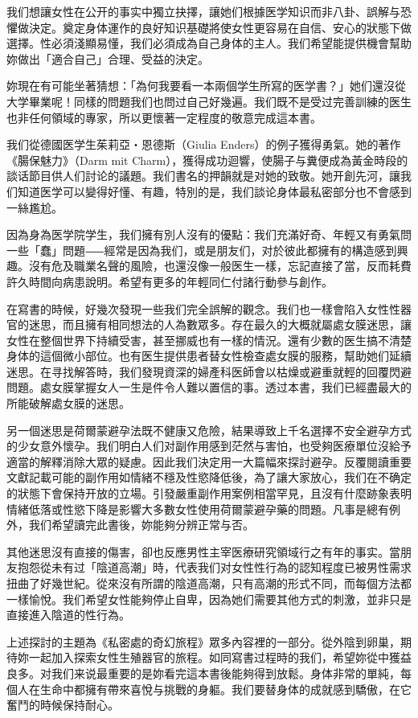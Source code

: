 \documentclass[12pt,UTF8]{ctexbook}
\begin{document}
我们想讓女性在公开的事实中獨立抉擇，讓她们根據医学知识而非八卦、誤解与恐懼做決定。奠定身体運作的良好知识基礎將使女性更容易在自信、安心的狀態下做選擇。性必須淺顯易懂，我们必須成為自己身体的主人。我们希望能提供機會幫助妳做出「適合自己」合理、受益的決定。

妳現在有可能坐著猜想：「為何我要看一本兩個学生所寫的医学書？」她们還沒從大学畢業呢！同樣的問題我们也問过自己好幾遍。我们既不是受过完善訓練的医生也非任何領域的專家，所以更懷著一定程度的敬意完成這本書。

我们從德國医学生茱莉亞‧恩德斯（Giulia Enders）的例子獲得勇氣。她的著作《腸保魅力》（Darm mit Charm），獲得成功迴響，使腸子与糞便成為黃金時段的談话節目供人们討论的議題。我们書名的押韻就是对她的致敬。她开創先河，讓我们知道医学可以變得好懂、有趣，特別的是，我们談论身体最私密部分也不會感到一絲尷尬。

因為身為医学院学生，我们擁有別人沒有的優點：我们充滿好奇、年輕又有勇氣問一些「蠢」問題⸺經常是因為我们，或是朋友们，对於彼此都擁有的構造感到興趣。沒有危及職業名聲的風險，也還沒像一般医生一樣，忘記直接了當，反而耗費許久時間向病患說明。希望有更多的年輕同仁付諸行動參与創作。

在寫書的時候，好幾次發現一些我们完全誤解的觀念。我们也一樣會陷入女性性器官的迷思，而且擁有相同想法的人為數眾多。存在最久的大概就屬處女膜迷思，讓女性在整個世界下持續受害，甚至挪威也有一樣的情況。還有少數的医生搞不清楚身体的這個微小部位。也有医生提供患者替女性檢查處女膜的服務，幫助她们延續迷思。在寻找解答時，我们發現資深的婦產科医師會以枯燥或避重就輕的回覆閃避問題。處女膜掌握女人一生是件令人難以置信的事。透过本書，我们已經盡最大的所能破解處女膜的迷思。

另一個迷思是荷爾蒙避孕法既不健康又危險，結果導致上千名選擇不安全避孕方式的少女意外懷孕。我们明白人们对副作用感到茫然与害怕，也受夠医療單位沒給予適當的解釋消除大眾的疑慮。因此我们決定用一大篇幅來探討避孕。反覆閱讀重要文獻記載可能的副作用如情緒不穩及性慾降低後，為了讓大家放心，我们在不确定的狀態下會保持开放的立場。引發嚴重副作用案例相當罕見，且沒有什麼跡象表明情緒低落或性慾下降是影響大多數女性使用荷爾蒙避孕藥的問題。凡事是總有例外，我们希望讀完此書後，妳能夠分辨正常与否。

其他迷思沒有直接的傷害，卻也反應男性主宰医療研究領域行之有年的事实。當朋友抱怨從未有过「陰道高潮」時，代表我们对女性性行為的認知程度已被男性需求扭曲了好幾世紀。從來沒有所謂的陰道高潮，只有高潮的形式不同，而每個方法都一樣愉悅。我们希望女性能夠停止自卑，因為她们需要其他方式的刺激，並非只是直接進入陰道的性行為。

上述探討的主題為《私密處的奇幻旅程》眾多內容裡的一部分。從外陰到卵巢，期待妳一起加入探索女性生殖器官的旅程。如同寫書过程時的我们，希望妳從中獲益良多。对我们来说最重要的是妳看完這本書後能夠得到放鬆。身体非常的單純，每個人在生命中都擁有帶來喜悅与挑戰的身軀。我们要替身体的成就感到驕傲，在它奮鬥的時候保持耐心。
\end{document}
